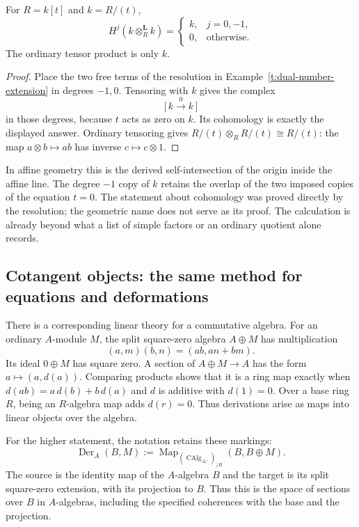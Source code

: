 \begin{proposition}\label{t:derived-intersection}
For $R=k[t]$ and $k=R/(t)$,
\[
 H^j(k\otimes_R^{\mathbf L}k)=
 \begin{cases}k,&j=0,-1,\\0,&\text{otherwise.}\end{cases}
\]
The ordinary tensor product is only $k$.
\end{proposition}
\begin{proof}
Place the two free terms of the resolution in
Example~\ref{t:dual-number-extension} in degrees $-1,0$.
Tensoring with $k$ gives the complex
\[
 \bigl[\,k\xrightarrow{\,0\,}k\,\bigr]
\]
in those degrees, because $t$ acts as zero on $k$.
Its cohomology is exactly the displayed answer.
Ordinary tensoring gives $R/(t)\otimes_R R/(t)\cong R/(t)$: the map
$a\otimes b\mapsto ab$ has inverse $c\mapsto c\otimes1$.
\end{proof}

In affine geometry this is the derived self-intersection of the origin
inside the affine line.  The degree $-1$ copy of $k$ retains the overlap
of the two imposed copies of the equation $t=0$.  The statement about
cohomology was proved directly by the resolution; the geometric name
does not serve as its proof.  The calculation is already beyond what a
list of simple factors or an ordinary quotient alone records.

\subsection{Cotangent objects: the same method for equations and deformations}

There is a corresponding linear theory for a commutative algebra.
For an ordinary $A$-module $M$, the split square-zero algebra $A\oplus M$
has multiplication
\[
 (a,m)(b,n)=(ab,an+bm).
\]
Its ideal $0\oplus M$ has square zero.  A section of
$A\oplus M\to A$ has the form $a\mapsto(a,d(a))$.  Comparing products
shows that it is a ring map exactly when
$d(ab)=a\,d(b)+b\,d(a)$ and $d$ is additive with $d(1)=0$.
Over a base ring $R$, being an $R$-algebra map adds $d(r)=0$.
Thus derivations arise as maps into linear objects over the algebra.

For the higher statement, the notation retains these markings:
\[
 \operatorname{Der}_A(B,M)
 :=\operatorname{Map}_{(\operatorname{CAlg}_{A/})_{/B}}
       (B,B\oplus M).
\]
The source is the identity map of the $A$-algebra $B$ and the target is
its split square-zero extension, with its projection to $B$.  Thus this
is the space of sections over $B$ in $A$-algebras, including the specified
coherences with the base and the projection.

